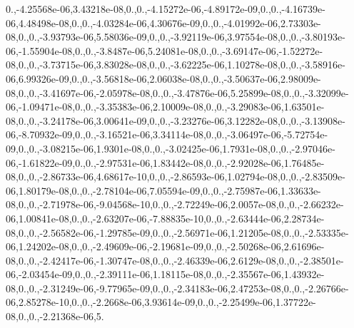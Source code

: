 \begin{DoxyCompactItemize}
0.,-\/4.\-25568e-\/06,3.\-43218e-\/08,0.,0.,-\/4.\-15272e-\/06,-\/4.\-89172e-\/09,0.,0.,-\/4.\-16739e-\/06,4.\-48498e-\/08,0.,0.,-\/4.\-03284e-\/06,4.\-30676e-\/09,0.,0.,-\/4.\-01992e-\/06,2.\-73303e-\/08,0.,0.,-\/3.\-93793e-\/06,5.\-58036e-\/09,0.,0.,-\/3.\-92119e-\/06,3.\-97554e-\/08,0.,0.,-\/3.\-80193e-\/06,-\/1.\-55904e-\/08,0.,0.,-\/3.\-8487e-\/06,5.\-24081e-\/08,0.,0.,-\/3.\-69147e-\/06,-\/1.\-52272e-\/08,0.,0.,-\/3.\-73715e-\/06,3.\-83028e-\/08,0.,0.,-\/3.\-62225e-\/06,1.\-10278e-\/08,0.,0.,-\/3.\-58916e-\/06,6.\-99326e-\/09,0.,0.,-\/3.\-56818e-\/06,2.\-06038e-\/08,0.,0.,-\/3.\-50637e-\/06,2.\-98009e-\/08,0.,0.,-\/3.\-41697e-\/06,-\/2.\-05978e-\/08,0.,0.,-\/3.\-47876e-\/06,5.\-25899e-\/08,0.,0.,-\/3.\-32099e-\/06,-\/1.\-09471e-\/08,0.,0.,-\/3.\-35383e-\/06,2.\-10009e-\/08,0.,0.,-\/3.\-29083e-\/06,1.\-63501e-\/08,0.,0.,-\/3.\-24178e-\/06,3.\-00641e-\/09,0.,0.,-\/3.\-23276e-\/06,3.\-12282e-\/08,0.,0.,-\/3.\-13908e-\/06,-\/8.\-70932e-\/09,0.,0.,-\/3.\-16521e-\/06,3.\-34114e-\/08,0.,0.,-\/3.\-06497e-\/06,-\/5.\-72754e-\/09,0.,0.,-\/3.\-08215e-\/06,1.\-9301e-\/08,0.,0.,-\/3.\-02425e-\/06,1.\-7931e-\/08,0.,0.,-\/2.\-97046e-\/06,-\/1.\-61822e-\/09,0.,0.,-\/2.\-97531e-\/06,1.\-83442e-\/08,0.,0.,-\/2.\-92028e-\/06,1.\-76485e-\/08,0.,0.,-\/2.\-86733e-\/06,4.\-68617e-\/10,0.,0.,-\/2.\-86593e-\/06,1.\-02794e-\/08,0.,0.,-\/2.\-83509e-\/06,1.\-80179e-\/08,0.,0.,-\/2.\-78104e-\/06,7.\-05594e-\/09,0.,0.,-\/2.\-75987e-\/06,1.\-33633e-\/08,0.,0.,-\/2.\-71978e-\/06,-\/9.\-04568e-\/10,0.,0.,-\/2.\-72249e-\/06,2.\-0057e-\/08,0.,0.,-\/2.\-66232e-\/06,1.\-00841e-\/08,0.,0.,-\/2.\-63207e-\/06,-\/7.\-88835e-\/10,0.,0.,-\/2.\-63444e-\/06,2.\-28734e-\/08,0.,0.,-\/2.\-56582e-\/06,-\/1.\-29785e-\/09,0.,0.,-\/2.\-56971e-\/06,1.\-21205e-\/08,0.,0.,-\/2.\-53335e-\/06,1.\-24202e-\/08,0.,0.,-\/2.\-49609e-\/06,-\/2.\-19681e-\/09,0.,0.,-\/2.\-50268e-\/06,2.\-61696e-\/08,0.,0.,-\/2.\-42417e-\/06,-\/1.\-30747e-\/08,0.,0.,-\/2.\-46339e-\/06,2.\-6129e-\/08,0.,0.,-\/2.\-38501e-\/06,-\/2.\-03454e-\/09,0.,0.,-\/2.\-39111e-\/06,1.\-18115e-\/08,0.,0.,-\/2.\-35567e-\/06,1.\-43932e-\/08,0.,0.,-\/2.\-31249e-\/06,-\/9.\-77965e-\/09,0.,0.,-\/2.\-34183e-\/06,2.\-47253e-\/08,0.,0.,-\/2.\-26766e-\/06,2.\-85278e-\/10,0.,0.,-\/2.\-2668e-\/06,3.\-93614e-\/09,0.,0.,-\/2.\-25499e-\/06,1.\-37722e-\/08,0.,0.,-\/2.\-21368e-\/06,5.\
\end{DoxyCompactItemize}
